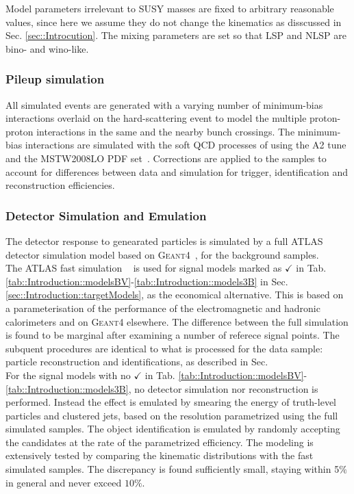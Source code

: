 Model parameters irrelevant to SUSY masses are fixed to arbitrary reasonable values, 
since here we assume they do not change the kinematics as disscussed in Sec. \ref{sec::Introcution}.
The mixing parameters are set so that LSP and NLSP are bino- and wino-like. \\



\subsubsection{Pileup simulation}
All simulated events are generated with a varying number of minimum-bias interactions overlaid on the hard-scattering event to model the multiple proton-proton interactions in the same and the nearby bunch crossings.
The minimum-bias interactions are simulated with the soft QCD processes of  using the A2 tune \cite{ATLAS:2012uec} and the MSTW2008LO PDF set~\cite{Martin:2009iq}. 
Corrections are applied to the samples to account for differences between data and simulation for trigger, identification and reconstruction efficiencies. \\



\subsubsection{Detector Simulation and Emulation}
The detector response to genearated particles is simulated by a full ATLAS detector simulation model \cite{ATLASFullSimu:2010wqa} based on \textsc{Geant4}~\cite{Agostinelli:2002hh}, for the background samples. \\

The ATLAS fast simulation ~\cite{atlfast} is used for signal models marked as $\checkmark$ in Tab. \ref{tab::Introduction::modelsBV}-\ref{tab::Introduction::models3B} in Sec. \ref{sec::Introduction::targetModels}, as the economical alternative. This is based on a parameterisation of the performance of the electromagnetic and hadronic calorimeters and on \textsc{Geant4} elsewhere. The difference between the full simulation is found to be marginal after examining a number of referece signal points.
The subquent procedures are identical to what is processed for the data sample: particle reconstruction and identifications, as described in Sec. \\

For the signal models with no $\checkmark$ in Tab. \ref{tab::Introduction::modelsBV}-\ref{tab::Introduction::models3B}, no detector simulation nor reconstruction is performed. Instead the effect is emulated by smearing the energy of truth-level particles and clustered jets, based on the resolution parametrized using the full simulated samples. The object identification is emulated by randomly accepting the candidates at the rate of the parametrized efficiency. The modeling is extensively tested by comparing the kinematic distributions with the fast simulated samples. The discrepancy is found sufficiently small, staying within 5$\%$ in general and never exceed $10\%$. \\

